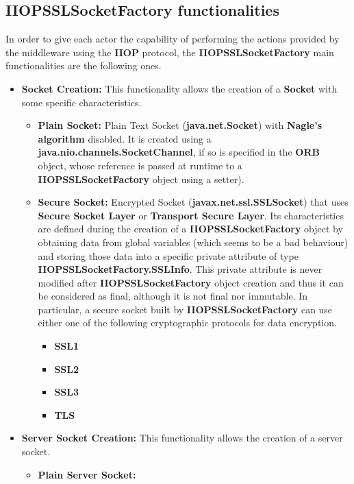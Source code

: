 \subsection{IIOPSSLSocketFactory functionalities}
In order to give each actor the capability of performing the actions provided by the middleware using the \textbf{IIOP} protocol, the \textbf{IIOPSSLSocketFactory} main functionalities are the following ones.
\begin{itemize}
	\item \textbf{Socket Creation:}
		This functionality allows the creation of a \textbf{Socket} with some specific characteristics.
		\begin{itemize}
			\item \textbf{Plain Socket:}
				Plain Text Socket (\textbf{java.net.Socket}) with \textbf{Nagle's algorithm} disabled.
				It is created using a \textbf{java.nio.channels.SocketChannel}, if so is specified in the \textbf{ORB} object, whose reference is passed at runtime to a \textbf{IIOPSSLSocketFactory} object using a setter).
			\item \textbf{Secure Socket:}
				Encrypted Socket (\textbf{javax.net.ssl.SSLSocket}) that uses \textbf{Secure Socket Layer} or \textbf{Transport Secure Layer}.
				Its characteristics are defined during the creation of a \textbf{IIOPSSLSocketFactory} object by obtaining data from global variables (which seems to be a bad behaviour) and storing those data into a specific private attribute of type \textbf{IIOPSSLSocketFactory.SSLInfo}.
				This private attribute is never modified after \textbf{IIOPSSLSocketFactory} object creation and thus it can be considered as final, although it is not final nor immutable.
				In particular, a secure socket built by \textbf{IIOPSSLSocketFactory} can use either one of the following cryptographic protocols for data encryption.
				\begin{itemize}
					\item \textbf{SSL1} 
					\item \textbf{SSL2}
					\item \textbf{SSL3}
					\item \textbf{TLS}
				\end{itemize}
		\end{itemize}
	\item \textbf{Server Socket Creation:}
		This functionality allows the creation of a server socket.
		\begin{itemize}
			\item \textbf{Plain Server Socket:}

\end{itemize}
\end{itemize}
